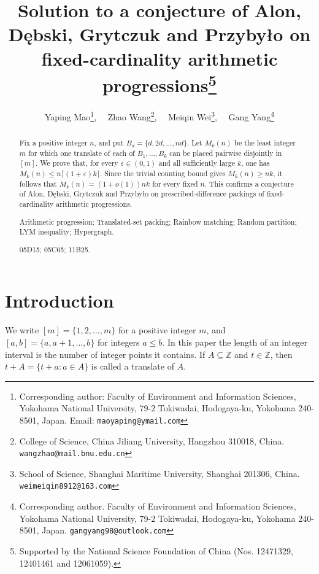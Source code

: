 \documentclass[twoside,12pt]{article}
\numberwithin{equation}{section}
\newcommand{\Z}{\mathbb{Z}}
\newcommand{\eps}{\varepsilon}
\begin{document}
\title{\textbf{Solution to a conjecture of Alon, D\k{e}bski, Grytczuk and Przyby\l{}o on
fixed-cardinality arithmetic progressions\footnote{Supported by the National Science Foundation of China
(Nos. 12471329, 12401461 and 12061059).}}}
\author{Yaping Mao\footnote{Corresponding author: Faculty of Environment and Information
Sciences, Yokohama National University, 79-2 Tokiwadai, Hodogaya-ku,
Yokohama 240-8501, Japan. {Email: \tt maoyaping@ymail.com}}, \ \ Zhao
Wang\footnote{College of Science, China Jiliang University, Hangzhou
310018, China. {\tt
wangzhao@mail.bnu.edu.cn}}, \ \ 
Meiqin Wei\footnote{School of Science, Shanghai Maritime University, Shanghai 201306, China. {\tt weimeiqin8912@163.com}}, \ \ 
Gang Yang\footnote{Corresponding author. Faculty of Environment and Information Sciences, Yokohama National University, 79-2 Tokiwadai, Hodogaya-ku, Yokohama 240-8501, Japan. {\tt gangyang98@outlook.com}}}
\date{}
\maketitle

\begin{abstract}
Fix a positive integer $n$, and put $B_d=\{d,2d,\ldots,nd\}$.  Let $M_k(n)$
be the least integer $m$ for which one translate of each of
$B_1,\ldots,B_k$ can be placed pairwise disjointly in $[m]$.  We prove that,
for every $\eps\in(0,1)$ and all sufficiently large $k$, one has
$M_k(n)\le n\lceil(1+\eps)k\rceil$.  Since the trivial counting bound gives
$M_k(n)\ge nk$, it follows that $M_k(n)=(1+o(1))nk$ for every fixed $n$.
This confirms a conjecture of Alon, D\k{e}bski, Grytczuk and Przyby\l{}o on
prescribed-difference packings of fixed-cardinality arithmetic progressions.
\vspace{1mm}

 Arithmetic progression; Translated-set packing; Rainbow matching; Random partition; LYM inequality; Hypergraph.

\noindent {\bf AMS subject classification 2020:} 05D15; 05C65; 11B25.
\end{abstract}

\section{Introduction}

We write $[m]=\{1,2,\ldots,m\}$ for a positive integer $m$, and
$[a,b]=\{a,a+1,\ldots,b\}$ for integers $a\le b$.  In this paper the length
of an integer interval is the number of integer points it contains.  If
$A\subseteq\Z$ and $t\in\Z$, then $t+A=\{t+a:a\in A\}$ is called a translate
of $A$.
\end{document}
